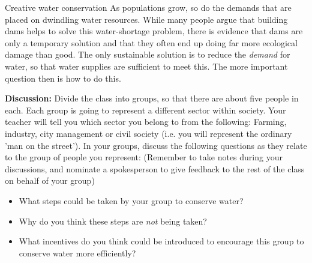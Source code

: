             \begin{groupdiscussion}{ Creative water conservation
}
            \nopagebreak
\label{m38138*uid289435}As populations grow, so do the demands that are placed on dwindling water resources. While many people argue that building dams helps to solve this water-shortage problem, there is evidence that dams are only a temporary solution and that they often end up doing far more ecological damage than good. The only sustainable solution is to reduce the \textsl{demand} for water, so that water supplies are sufficient to meet this. The more important question then is how to do this.
\par 
\label{m38138*uid5630}\textbf{Discussion:}\newline
    Divide the class into groups, so that there are about five people in each. Each group is going to represent a different sector within society. Your teacher will tell you which sector you belong to from the following: Farming, industry, city management or civil society (i.e. you will represent the ordinary 'man on the street'). In your groups, discuss the following questions as they relate to the group of people you represent: (Remember to take notes during your discussions, and nominate a spokesperson to give feedback to the rest of the class on behalf of your group)
\label{m38138*id342317}\begin{itemize}[noitemsep]
            \label{m38138*uid88}\item What steps could be taken by your group to conserve water?
\label{m38138*uid89}\item Why do you think these steps are \textsl{not} being taken?
\label{m38138*uid90}\item What incentives do you think could be introduced to encourage this group to conserve water more efficiently?
\end{itemize}
\end{groupdiscussion}
\par 
\label{m38138*id0123}
